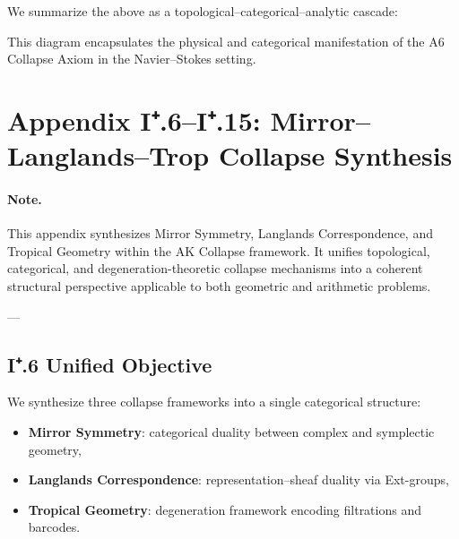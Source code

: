 \documentclass[11pt]{article}
\begin{document}
We summarize the above as a topological–categorical–analytic cascade:

\begin{center}
\end{center}

This diagram encapsulates the physical and categorical manifestation  
of the A6 Collapse Axiom in the Navier--Stokes setting.




\section*{Appendix I⁺.6–I⁺.15: Mirror–Langlands–Trop Collapse Synthesis}

\paragraph{Note.}  
This appendix synthesizes Mirror Symmetry, Langlands Correspondence, and Tropical Geometry  
within the AK Collapse framework. It unifies topological, categorical, and degeneration-theoretic  
collapse mechanisms into a coherent structural perspective applicable to both geometric and arithmetic problems.

---

\subsection*{I⁺.6 Unified Objective}

We synthesize three collapse frameworks into a single categorical structure:

\begin{itemize}
  \item \textbf{Mirror Symmetry}: categorical duality between complex and symplectic geometry,
  \item \textbf{Langlands Correspondence}: representation–sheaf duality via Ext-groups,
  \item \textbf{Tropical Geometry}: degeneration framework encoding filtrations and barcodes.
\end{itemize}
\end{document}
